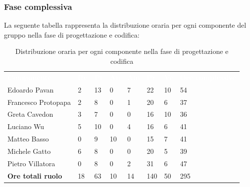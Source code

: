\subsubsection{Fase complessiva}
La seguente tabella rappresenta la distribuzione oraria per ogni componente del gruppo nella fase di progettazione e codifica:
\begin{table}[H]
\begin{center}
\renewcommand{\arraystretch}{1.25}
\begin{tabular}{ m{}<{\centering}  m{}<{\centering} m{}<{\centering} m{}<{\centering}  m{}<{\centering}  m{}<{\centering}  m{}<{\centering}  m{}<{\centering}   }
	\rowcolor{darkblue}
	\textcolor{white}{\textbf{Componente}} &\textcolor{white}{\textbf{Re}}&\textcolor{white}{\textbf{Pt}}&\textcolor{white}{\textbf{An}}&\textcolor{white}{\textbf{Am}}&\textcolor{white}{\textbf{Pr}}&\textcolor{white}{\textbf{Ve}}&\textcolor{white}{\textbf{Ore complessive}}\\ 
	Edoardo Pavan & 2 & 13 & 0 & 7 & 22 & 10 & 54 \\	
	
	Francesco Protopapa & 2 & 8 & 0 & 1 & 20 & 6 & 37 \\

	Greta Cavedon & 3 & 7 & 0 & 0 & 16 & 10 & 36 \\
	
	Luciano Wu & 5 & 10 & 0 & 4 & 16 & 6 & 41 \\
	
	Matteo Basso & 0 & 9 & 10 & 0 & 15 & 7 & 41 \\
	
	Michele Gatto &  6 & 8 & 0 & 0 & 20 & 5 & 39 \\
	
	Pietro Villatora & 0 & 8 & 0 & 2 & 31 & 6 & 47 \\
	
	\textbf{Ore totali ruolo} & 18 & 63 & 10 & 14 & 140 & 50 & 295\\

\end{tabular}
\caption{Distribuzione oraria per ogni componente nella fase di progettazione e codifica}
\end{center}
\end{table}

